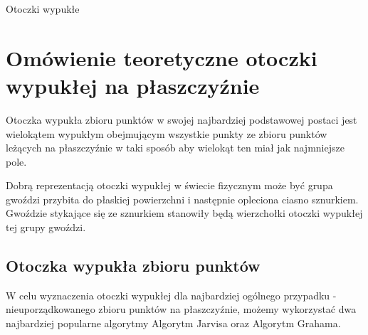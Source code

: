 \newcommand*{\includesDirectory}{includes}
\newcommand*{\settingsDirectory}{\includesDirectory/settings}
\newcommand*{\tikzDirectory}{\includesDirectory/tikz}
\newcommand*{\proovesDirectory}{\includesDirectory/prooves}
\newcommand*{\oneDirectory}{\proovesDirectory/one}


















\setlength{\abovedisplayskip}{0pt}
\setlength{\belowdisplayskip}{9pt}
\setlength{\abovedisplayshortskip}{0pt}
\setlength{\belowdisplayshortskip}{9pt}
\setlength{\jot}{18pt}

    \thispagestyle{empty}
    \begin{center}
        \Huge{Otoczki wypukłe}
    \end{center}
    \tableofcontents	

  

    \chapter{Omówienie teoretyczne otoczki wypukłej na płaszczyźnie}
    Otoczka wypukła zbioru punktów w swojej najbardziej podstawowej postaci jest wielokątem wypukłym obejmującym wszystkie punkty ze zbioru punktów leżących na płaszczyźnie w taki sposób aby wielokąt ten miał jak najmniejsze pole.    
    \begin{center}
    	
    \end{center}
        
    
    Dobrą reprezentacją otoczki wypukłej w świecie fizycznym może być grupa gwoździ przybita do płaskiej powierzchni i następnie opleciona ciasno sznurkiem. Gwoździe stykające się ze sznurkiem stanowiły będą wierzchołki otoczki wypukłej tej grupy gwoździ.
        \section{Otoczka wypukła zbioru punktów}
        W celu wyznaczenia otoczki wypukłej dla najbardziej ogólnego przypadku - nieuporządkowanego zbioru punktów na płaszczyźnie, możemy wykorzystać dwa najbardziej popularne algorytmy Algorytm Jarvisa oraz Algorytm Grahama.
        
